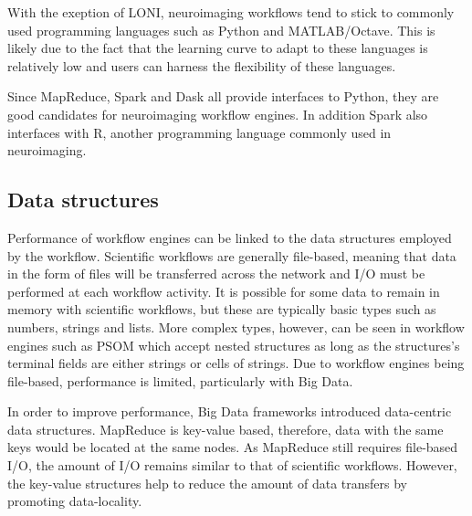             With the exeption of LONI, neuroimaging workflows tend to stick to
            commonly used programming languages such as Python and
            MATLAB/Octave. This is likely due to the fact that the learning
            curve to adapt to these languages is relatively low and users can
            harness the flexibility of these languages. 
            
            Since MapReduce, Spark and Dask all provide interfaces to Python,  
            they are good candidates for neuroimaging workflow engines. In
            addition Spark also interfaces with R, another programming language
            commonly used in neuroimaging.

            \subsection{Data structures}\label{ds}
                
                Performance of workflow engines can be linked to the data
                structures employed by the workflow. Scientific workflows are
                generally file-based, meaning that data in the form of files
                will be transferred across the network and I/O must be performed
                at each workflow activity. It is possible for some data to
                remain in memory with scientific workflows, but these are
                typically basic types such as numbers, strings and lists. More
                complex types, however, can be seen in workflow engines such as
                PSOM which accept nested structures as long as the structures's
                terminal fields are either strings or cells of strings. Due to
                workflow engines being file-based, performance is limited,
                particularly with Big Data.
                
                In order to improve performance, Big Data frameworks introduced
                data-centric data structures. MapReduce is key-value based,
                therefore, data with the same keys would be located at the same
                nodes. As MapReduce still requires file-based I/O, the amount of
                I/O remains similar to that of scientific workflows. However,
                the key-value structures help to reduce the amount of data
                transfers by promoting data-locality.


